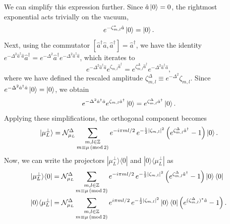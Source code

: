 \documentclass[11pt]{article}
\begin{document}
We can simplify this expression further. Since $\hat{a}\ket{0} = 0$, the rightmost exponential acts trivially on the vacuum,
\begin{equation}
    e^{-\zeta_{m,l}^* \hat{a}} \ket{0} = \ket{0}.
\end{equation}
Next, using the commutator $[\hat{a}^\dagger \hat{a}, \hat{a}^\dagger] = \hat{a}^\dagger$, we have the identity $e^{-\Delta^2 \hat{a}^\dagger \hat{a}} \hat{a}^\dagger = e^{-\Delta^2} \hat{a}^\dagger e^{-\Delta^2 \hat{a}^\dagger \hat{a}}$, which iterates to
\begin{equation}
    e^{-\Delta^2 \hat{a}^\dagger \hat{a}} e^{\zeta_{m,l} \hat{a}^\dagger} = e^{\zeta_{m,l}^\Delta \hat{a}^\dagger} e^{-\Delta^2 \hat{a}^\dagger \hat{a}},
\end{equation}
where we have defined the rescaled amplitude $\zeta_{m,l}^\Delta \equiv e^{-\Delta^2} \zeta_{m,l}$. Since $e^{-\Delta^2 \hat{a}^\dagger \hat{a}} \ket{0} = \ket{0}$, we obtain
\begin{equation}
    e^{-\Delta^2 \hat{a}^\dagger \hat{a}} e^{\zeta_{m,l} \hat{a}^\dagger} \ket{0} = e^{\zeta_{m,l}^\Delta \hat{a}^\dagger} \ket{0}.
\end{equation}
Applying these simplifications, the orthogonal component becomes
\begin{equation}
    |\mu_L^{\perp}\rangle = \mathcal{N}_{\mu_L}^{\Delta} \sum_{\substack{m, l \in \mathbb{Z} \\ m \equiv \mu \,(\mathrm{mod}\, 2)}} e^{-i \pi m l / 2} \, e^{-\frac{1}{2} \abs{\zeta_{m,l}}^2} \left(e^{\zeta_{m,l}^\Delta \hat{a}^\dagger} - 1\right) \ket{0}.
\end{equation}
Now, we can write the projectors $|\mu_L^{\perp}\rangle \langle 0|$ and $|0 \rangle \langle \mu_L^{\perp}|$ as
\begin{align}
    |\mu_L^{\perp}\rangle \langle 0| & = \mathcal{N}_{\mu_L}^{\Delta} \sum_{\substack{m, l \in \mathbb{Z} \\ m \equiv \mu \,(\mathrm{mod}\, 2)}} e^{-i \pi m l / 2} \, e^{-\frac{1}{2} \abs{\zeta_{m,l}}^2} \left(e^{\zeta_{m,l}^\Delta \hat{a}^\dagger} - 1\right) \ket{0}\bra{0} \\
    |0\rangle \langle\mu_L^{\perp}|  & = \mathcal{N}_{\mu_L}^{\Delta} \sum_{\substack{m, l \in \mathbb{Z} \\ m \equiv \mu \,(\mathrm{mod}\, 2)}} e^{i \pi m l / 2} \, e^{-\frac{1}{2} \abs{\zeta_{m,l}}^2} \ket{0}\bra{0} \left(e^{(\zeta_{m,l}^\Delta)^* \hat{a}} - 1\right).
\end{align}
\end{document}
